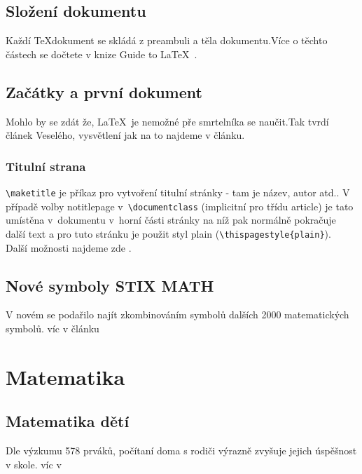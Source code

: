 \documentclass[a4paper, 11pt]{article}
\begin{document}
    
    \subsection{Složení dokumentu}
    
    Každí \TeX dokument se skládá z preambuli a těla dokumentu.Více o těchto částech se dočtete v knize Guide to \LaTeX\ \cite{Kopka2004}.
    
    \subsection{Začátky a první dokument}
    Mohlo by se zdát že, \LaTeX\ je nemožné pře smrtelníka se naučit.Tak tvrdí článek Veselého, vysvětlení jak na to najdeme v článku. \cite{Vesely1991}
    
    
    \subsubsection{Titulní strana}
    \verb|\maketitle| je příkaz pro vytvoření titulní stránky - tam je název, autor atd.. V případě volby notitlepage v~\verb|\documentclass| (implicitní pro třídu article) je tato  umístěna v~dokumentu v~horní části stránky na níž pak normálně pokračuje další text a pro tuto stránku je použit styl plain (\verb|\thispagestyle{plain}|).\\ Další možnosti najdeme zde \cite{Sopouch2001}.
    
    
    \subsection{Nové symboly STIX MATH}
    
    V novém se podařilo najít zkombinováním symbolů dalších 2000 matematických symbolů. víc v článku \cite{GratzerG2015}
    
    \section{Matematika}
    
    \subsection{Matematika dětí}
    
    Dle výzkumu 578 prváků, počítaní doma s rodiči výrazně zvyšuje jejich úspěšnost v skole. víc v \cite{BerkowitzTalia2015}
    
    
    
    
    
    
    
    
    
    
    
    
   
    
    
	

	
	
	
	\newpage
	
	\renewcommand{\refname}{Použitá Literatura}
	
\end{document}
